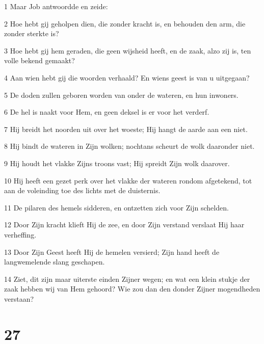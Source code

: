 \par 1 Maar Job antwoordde en zeide:
\par 2 Hoe hebt gij geholpen dien, die zonder kracht is, en behouden den arm, die zonder sterkte is?
\par 3 Hoe hebt gij hem geraden, die geen wijsheid heeft, en de zaak, alzo zij is, ten volle bekend gemaakt?
\par 4 Aan wien hebt gij die woorden verhaald? En wiens geest is van u uitgegaan?
\par 5 De doden zullen geboren worden van onder de wateren, en hun inwoners.
\par 6 De hel is naakt voor Hem, en geen deksel is er voor het verderf.
\par 7 Hij breidt het noorden uit over het woeste; Hij hangt de aarde aan een niet.
\par 8 Hij bindt de wateren in Zijn wolken; nochtans scheurt de wolk daaronder niet.
\par 9 Hij houdt het vlakke Zijns troons vast; Hij spreidt Zijn wolk daarover.
\par 10 Hij heeft een gezet perk over het vlakke der wateren rondom afgetekend, tot aan de voleinding toe des lichts met de duisternis.
\par 11 De pilaren des hemels sidderen, en ontzetten zich voor Zijn schelden.
\par 12 Door Zijn kracht klieft Hij de zee, en door Zijn verstand verslaat Hij haar verheffing.
\par 13 Door Zijn Geest heeft Hij de hemelen versierd; Zijn hand heeft de langwemelende slang geschapen.
\par 14 Ziet, dit zijn maar uiterste einden Zijner wegen; en wat een klein stukje der zaak hebben wij van Hem gehoord? Wie zou dan den donder Zijner mogendheden verstaan?

\chapter{27}


